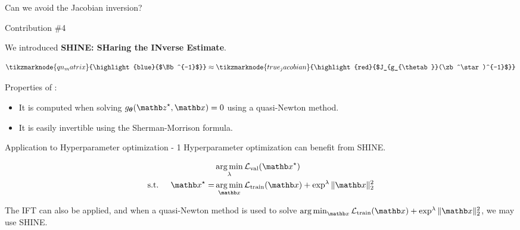\begin{frame}{Can we avoid the Jacobian inversion?}
    \begin{exampleblock}{Contribution \#4}
    \end{exampleblock}
    
    We introduced \textbf{SHINE: SHaring the INverse Estimate}.

    \begin{equation*}
        \tikzmarknode{qn_matrix}{\highlight{blue}{$\Bb^{-1}$}} \approx \tikzmarknode{true_jacobian}{\highlight{red}{$J_{g_{\thetab}}(\zb^\star)^{-1}$}}
    \end{equation*}

    \pause

    \hfill \break
    Properties of :
    \begin{itemize}
        \item<4-> It is computed when solving $g_\thetab(\zb^\star, \xb) = 0$ using a quasi-Newton method.
        \item<5-> It is easily invertible using the Sherman-Morrison formula.
    \end{itemize}
\end{frame}

\begin{frame}{Application to Hyperparameter optimization - 1}
    Hyperparameter optimization can benefit from SHINE.

    \begin{equation*}
        \begin{split}
            &\argmin_{\lambda} \mathcal{L}_{\text{val}}(\xb^\star)\\
            \text{s.t. } \quad \xb^\star = &\argmin_{\xb} \mathcal{L}_{\text{train}}(\xb) + \exp^{\lambda} \|\xb\|_2^2
        \end{split}
    \end{equation*}

    \pause
    The IFT can also be applied, and when a quasi-Newton method is used to solve $\argmin_{\xb} \mathcal{L}_{\text{train}}(\xb) + \exp^{\lambda} \|\xb\|_2^2$, we may use SHINE.
\end{frame}

